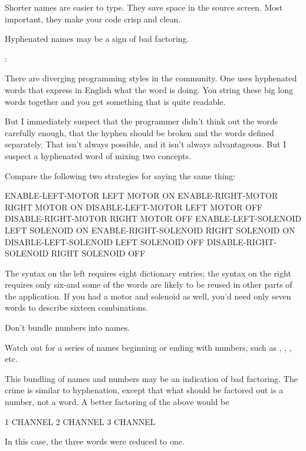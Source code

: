Shorter names are easier to type.  They save space in the source
screen.  Most important, they make your code crisp and clean.

\begin{tip}
Hyphenated names may be a sign of bad factoring.
\end{tip}%

\begin{interview}
:

\begin{tfquot}
There are diverging programming styles in the \Forth{} community.  One
uses hyphenated words that express in English what the word is doing.
You string these big long words together and you get something that is
quite readable.

But I immediately suspect that the programmer didn't think out the words
carefully enough, that the hyphen should be broken and the words defined
separately.  That isn't always possible, and it isn't always advantageous.
But I suspect a hyphenated word of mixing two concepts.
\end{tfquot}
\end{interview}
Compare the following two strategies for saying the same thing:
\begin{Code}
ENABLE-LEFT-MOTOR        LEFT MOTOR ON
ENABLE-RIGHT-MOTOR       RIGHT MOTOR ON
DISABLE-LEFT-MOTOR       LEFT MOTOR OFF
DISABLE-RIGHT-MOTOR      RIGHT MOTOR OFF
ENABLE-LEFT-SOLENOID     LEFT SOLENOID ON
ENABLE-RIGHT-SOLENOID    RIGHT SOLENOID ON
DISABLE-LEFT-SOLENOID    LEFT SOLENOID OFF
DISABLE-RIGHT-SOLENOID   RIGHT SOLENOID OFF
\end{Code}
The syntax on the left requires eight dictionary entries; the syntax
on the right requires only six-and some of the words are likely to be
reused in other parts of the application.  If you had a 
motor and solenoid as well, you'd need only seven words to describe
sixteen combinations.

\begin{tip}
Don't bundle numbers into names.
\end{tip}
Watch out for a series of names beginning or ending with numbers, such
as , , , etc.

This bundling of names and numbers may be an indication of bad
factoring.  The crime is similar to hyphenation, except that what
should be factored out is a number, not a word.  A better factoring of
the above would be
\begin{Code}
1 CHANNEL
2 CHANNEL
3 CHANNEL
\end{Code}
In this case, the three words were reduced to one.

